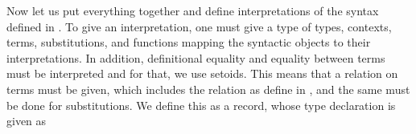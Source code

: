 
Now let us put everything together and define interpretations of the syntax defined in .
To give an interpretation, one must give a type of types, contexts, terms, substitutions, and functions mapping the syntactic objects to their interpretations.
In addition, definitional equality and equality between terms must be interpreted and for that, we use setoids.
This means that a relation on terms must be given, which includes the relation  as define in , and the same must be done for substitutions.
We define this as a record, whose type declaration is given as

\begin{code}%
\>[0]\AgdaSpace{}%
\AgdaSpace{}%
\AgdaSymbol{\{}\AgdaSpace{}%
\AgdaSymbol{\}}\AgdaSpace{}%
\AgdaSymbol{:}\AgdaSpace{}%
\AgdaSpace{}%
\AgdaSymbol{(}\AgdaSpace{}%
\AgdaSymbol{(}\AgdaSpace{}%
\AgdaSpace{}%
\AgdaSymbol{))}\AgdaSpace{}%
\<%
\end{code}

